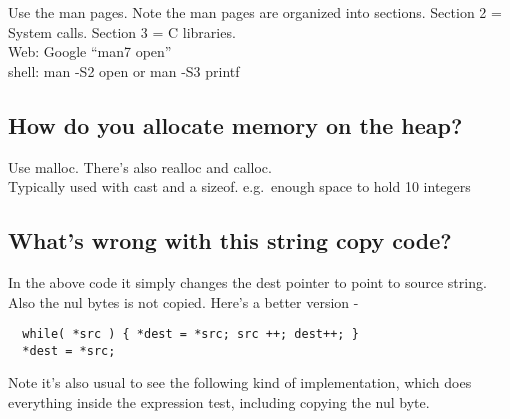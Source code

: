Use the man pages. Note the man pages are organized into sections.
Section 2 = System calls. Section 3 = C libraries.\\Web: Google ``man7
open''\\shell: man -S2 open or man -S3 printf

\subsection{How do you allocate memory on the
heap?}\label{how-do-you-allocate-memory-on-the-heap}

Use malloc. There's also realloc and calloc.\\Typically used with cast
and a sizeof. e.g.~enough space to hold 10 integers

\begin{Shaded}
\begin{Highlighting}[]
  \NormalTok{(}\NormalTok{) * }\NormalTok{);}
\end{Highlighting}
\end{Shaded}

\subsection{What's wrong with this string copy
code?}\label{whats-wrong-with-this-string-copy-code}

\begin{Shaded}
\begin{Highlighting}[]
 
\NormalTok{\}}
\end{Highlighting}
\end{Shaded}

In the above code it simply changes the dest pointer to point to source
string. Also the nul bytes is not copied. Here's a better version -

\begin{verbatim}
  while( *src ) { *dest = *src; src ++; dest++; } 
  *dest = *src;
\end{verbatim}

Note it's also usual to see the following kind of implementation, which
does everything inside the expression test, including copying the nul
byte.

